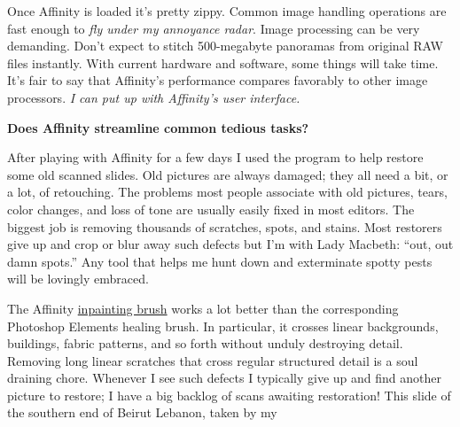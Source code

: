 Once Affinity is loaded it's pretty zippy. Common image handling
operations are fast enough to \emph{fly under my annoyance radar}. Image
processing can be very demanding. Don't expect to stitch 500-megabyte
panoramas from original RAW files instantly. With current hardware and
software, some things will take time. It's fair to say that Affinity's
performance compares favorably to other image processors. \emph{I can
put up with Affinity's user interface.}


\medskip
\noindent\textbf{Does Affinity streamline common tedious tasks?}
\medskip


After playing with Affinity for a few days I used the program to help
restore some old scanned slides. Old pictures are always damaged; they
all need a bit, or a lot, of retouching. The problems most people
associate with old pictures, tears, color changes, and loss of tone are
usually easily fixed in most editors. The biggest job is removing
thousands of scratches, spots, and stains. Most restorers give up and
crop or blur away such defects but I'm with Lady Macbeth: ``out, out
damn spots.'' Any tool that helps me hunt down and exterminate spotty
pests will be lovingly embraced.

The Affinity \href{https://vimeo.com/130966523}{inpainting brush} works
a lot better than the corresponding Photoshop Elements healing brush. In
particular, it crosses linear backgrounds, buildings, fabric patterns,
and so forth without unduly destroying detail. Removing long linear
scratches that cross regular structured detail is a soul draining chore.
Whenever I see such defects I typically give up and find another picture
to restore; I have a big backlog of scans awaiting restoration! This
slide of the southern end of Beirut Lebanon, taken by my


